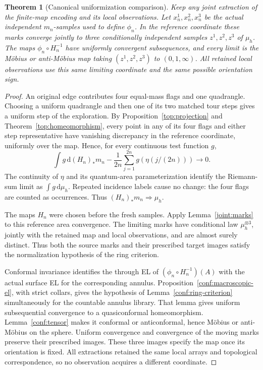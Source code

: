 \documentclass[11pt]{article}
\numberwithin{equation}{section}
\newtheorem{theorem}{Theorem}[section]
\theoremstyle{definition}
\theoremstyle{remark}
\newcommand{\1}{\mathbf 1}
\begin{document}
\begin{theorem}[Canonical uniformization comparison]
\label{conf:canonical}
Keep any joint extraction of the finite-map encoding and its local
observations.  Let \(x_n^1,x_n^2,x_n^3\) be the actual independent
\(m_n\)-samples used to define \(\phi_n\).  In the reference
coordinate these marks converge jointly to three conditionally
independent samples \(z^1,z^2,z^3\) of \(\mu_h\).  The maps
\(\phi_n\circ H_n^{-1}\) have uniformly convergent subsequences,
and every limit is the M\"obius or anti-M\"obius map taking
\((z^1,z^2,z^3)\) to \((0,1,\infty)\).  All retained local
observations use this same limiting coordinate and the same possible
orientation sign.
\end{theorem}

\begin{proof}
An original edge contributes four equal-mass flags and one
quadrangle.  Choosing a uniform quadrangle and then one of its
two matched tour steps gives a uniform step of the exploration.
By Proposition~\ref{top:projection} and Theorem~\ref{top:homeomorphism},
every point in any of its four
flags and either step representative have vanishing discrepancy
in the reference coordinate, uniformly over the map.  Hence, for
every continuous test function \(g\),
\[
 \int g\,\mathrm d (H_n)_*m_n
       -\frac1{2n}\sum_{j=1}^{2n}g(\eta(j/(2n)))
       \longrightarrow0.
\]
The continuity of \(\eta\) and its quantum-area parameterization
identify the Riemann-sum limit as \(\int g\,\mathrm d\mu_h\).
Repeated incidence labels cause no change: the four flags are
counted as occurrences.  Thus \((H_n)_*m_n\Rightarrow\mu_h\).

The maps \(H_n\) were chosen before the fresh samples.  Apply
Lemma~\ref{joint:marks} to this reference area convergence.  The
limiting marks have conditional law \(\mu_h^{\otimes3}\), jointly
with the retained map and local observations, and are almost surely
distinct.  Thus both the source marks and their prescribed target
images satisfy the normalization hypothesis of the ring criterion.

Conformal invariance identifies the through EL of
\((\phi_n\circ H_n^{-1})(A)\) with the actual surface EL for
the corresponding annulus.  Proposition~\ref{conf:macroscopic-el},
with strict collars, gives the hypothesis of
Lemma~\ref{conf:ring-criterion} simultaneously for the countable
annulus library.  That lemma gives uniform subsequential
convergence to a quasiconformal homeomorphism.  Lemma~\ref{conf:tensor}
makes it conformal or anticonformal, hence M\"obius or
anti-M\"obius on the sphere.  Uniform convergence and convergence
of the moving marks preserve their prescribed images.  These
three images specify the map once its orientation is fixed.
All extractions retained the same local arrays and topological
correspondence, so no observation acquires a different coordinate.
\end{proof}
\end{document}
